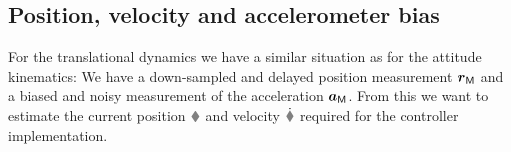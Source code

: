 

\subsection{Position, velocity and accelerometer bias}
For the translational dynamics we have a similar situation as for the attitude kinematics:
We have a down-sampled and delayed position measurement $\boldsymbol{r}_{\mathsf{M}}$ and a biased and noisy measurement of the acceleration $\boldsymbol{a}_{\mathsf{M}}$.
From this we want to estimate the current position $\r$ and velocity $\rd$ required for the controller implementation.

